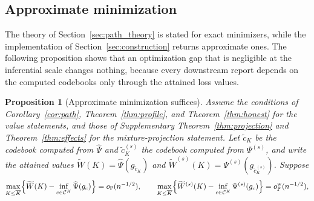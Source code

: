\documentclass[11pt]{article}
\newtheorem{proposition}{Proposition}
\newcommand{\Pp}{\mathbb P}
\newcommand{\opro}{o_{\Pp}}
\newcommand{\calC}{\mathcal C}
\newcommand{\hPsi}{\widehat\Psi}
\begin{document}
\subsection{Approximate minimization}\label{app:approxmin}
The theory of Section~\ref{sec:path_theory} is stated for exact minimizers, while the implementation of Section~\ref{sec:construction} returns approximate ones. The following proposition shows that an optimization gap that is negligible at the inferential scale changes nothing, because every downstream report depends on the computed codebooks only through the attained loss values.

\begin{proposition}[Approximate minimization suffices]\label{prop:approxmin}
Assume the conditions of Corollary~\ref{cor:path}, Theorem~\ref{thm:profile}, and Theorem~\ref{thm:honest} for the value statements, and those of Supplementary Theorem~\ref{thm:projection} and Theorem~\ref{thm:effects} for the mixture-projection statement. Let $\tilde c_K$ be the codebook computed from $\hPsi$ and $\tilde c^{(s)}_K$ the codebook computed from $\Psi^{(s)}$, and write the attained values $\widetilde W(K)=\hPsi(g_{\tilde c_K})$ and $\widetilde W^{(s)}(K)=\Psi^{(s)}(g_{\tilde c^{(s)}_K})$. Suppose
\begin{equation*}
\max_{K\le\overline K}\Bigl\{\widetilde W(K)-\inf_{c\in\calC^K}\hPsi(g_c)\Bigr\}=\opro(n^{-1/2}),
\qquad
\max_{K\le\overline K}\Bigl\{\widetilde W^{(s)}(K)-\inf_{c\in\calC^K}\Psi^{(s)}(g_c)\Bigr\}=\opro^{\mathrm w}(n^{-1/2}),
\end{equation*}

\end{proposition}
\end{document}
